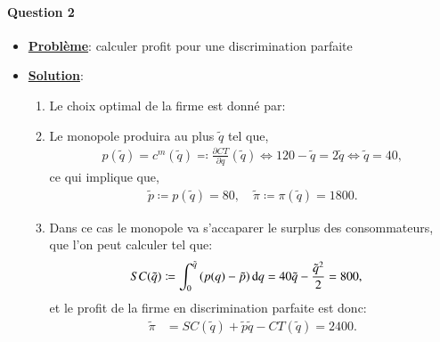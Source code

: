 \documentclass[notes, ignorenonframetext, compress, 9pt, xcolor=svgnames, aspectratio=169]{beamer}
\begin{document}
 \begin{frame}
  [allowframebreaks]{\insertsection}
  \framesubtitle{Question 2\\}
  \begin{itemize}
    \item \textbf{\underline{Problème}}: calculer  profit pour une discrimination parfaite
    \item \textbf{\underline{Solution}}: 
    \begin{enumerate}[$\cdot$]
      \item Le choix optimal de la firme est donné par:
      \item Le monopole produira  au plus $\tilde{q}$ tel que,
      \begin{align*}
        p(\tilde{q}) = c^m(\tilde{q}) \eqqcolon \frac{\partial CT}{\partial q}(\tilde{q}) 
        \Leftrightarrow  120 - \tilde{q} = 2\tilde{q}  \Leftrightarrow \tilde{q} = 40,
      \end{align*}
      ce qui implique que,
      \begin{align*}
        \tilde{p} \coloneqq p(\tilde{q}) = 80, \quad \tilde{\pi} \coloneqq \pi(\tilde{q}) = 1800.
        \end{align*}
      \item Dans ce cas le monopole va s’accaparer le surplus des consommateurs, que l’on peut calculer tel que:
       \begin{align*}
        SC(\tilde{q}) &\coloneqq\int_0^{\tilde{q}}\left({p(q) - \tilde{p}}\right)\mathop{}\!\mathrm{d} q =40\tilde{q} - \frac{\tilde{q}^{2}}{2}  = 800,
       \end{align*}
       et le profit de la firme en discrimination parfaite est donc:
       \begin{align*}
        \tilde{\pi} &= SC(\tilde{q}) + \tilde{p}\tilde{q} - CT(\tilde{q}) = 2400.
       \end{align*}
       
    \end{enumerate}
  \end{itemize}

\end{frame}
\end{document}
